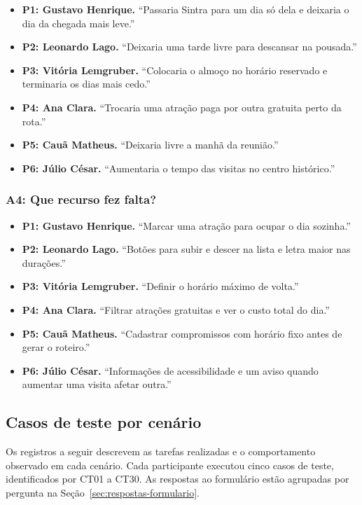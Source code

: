 \begin{itemize}
  \item \textbf{P1: Gustavo Henrique.} ``Passaria Sintra para um dia só dela e deixaria o dia da chegada mais leve.''
  \item \textbf{P2: Leonardo Lago.} ``Deixaria uma tarde livre para descansar na pousada.''
  \item \textbf{P3: Vitória Lemgruber.} ``Colocaria o almoço no horário reservado e terminaria os dias mais cedo.''
  \item \textbf{P4: Ana Clara.} ``Trocaria uma atração paga por outra gratuita perto da rota.''
  \item \textbf{P5: Cauã Matheus.} ``Deixaria livre a manhã da reunião.''
  \item \textbf{P6: Júlio César.} ``Aumentaria o tempo das visitas no centro histórico.''
\end{itemize}

\subsubsection{A4: Que recurso fez falta?}

\begin{itemize}
  \item \textbf{P1: Gustavo Henrique.} ``Marcar uma atração para ocupar o dia sozinha.''
  \item \textbf{P2: Leonardo Lago.} ``Botões para subir e descer na lista e letra maior nas durações.''
  \item \textbf{P3: Vitória Lemgruber.} ``Definir o horário máximo de volta.''
  \item \textbf{P4: Ana Clara.} ``Filtrar atrações gratuitas e ver o custo total do dia.''
  \item \textbf{P5: Cauã Matheus.} ``Cadastrar compromissos com horário fixo antes de gerar o roteiro.''
  \item \textbf{P6: Júlio César.} ``Informações de acessibilidade e um aviso quando aumentar uma visita afetar outra.''
\end{itemize}

\subsection{Casos de teste por cenário}

Os registros a seguir descrevem as tarefas realizadas e o comportamento observado em cada cenário. Cada participante executou cinco casos de teste, identificados por CT01 a CT30. As respostas ao formulário estão agrupadas por pergunta na Seção~\ref{sec:respostas-formulario}.

